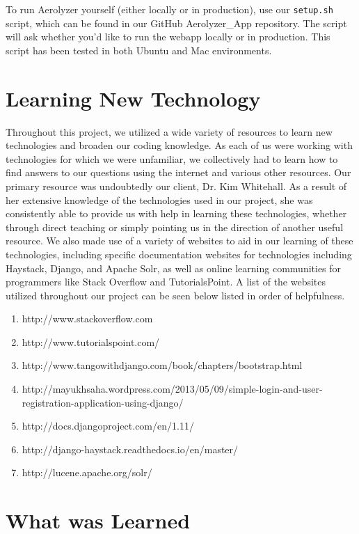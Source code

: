 \documentclass[onecolumn, draftclsnofoot,10pt, compsoc]{IEEEtran}
\begin{document}
\begin{flushleft}
To run Aerolyzer yourself (either locally or in production), use our \texttt{setup.sh} script, which can be found in our GitHub Aerolyzer\_App repository. The script will ask whether you'd like to run the webapp locally or in production. This script has been tested in both Ubuntu and Mac environments.
 
\section{Learning New Technology}
Throughout this project, we utilized a wide variety of resources to learn new technologies and broaden our coding knowledge. As each of us were working with technologies for which we were unfamiliar, we collectively had to learn how to find answers to our questions using the internet and various other resources.
\medskip
Our primary resource was undoubtedly our client, Dr. Kim Whitehall. As a result of her extensive knowledge of the technologies used in our project, she was consistently able to provide us with help in learning these technologies, whether through direct teaching or simply pointing us in the direction of another useful resource.
\medskip
We also made use of a variety of websites to aid in our learning of these technologies, including specific documentation websites for technologies including Haystack, Django, and Apache Solr, as well as online learning communities for programmers like Stack Overflow and TutorialsPoint. A list of the websites utilized throughout our project can be seen below listed in order of helpfulness.
\begin{enumerate}
    \item http://www.stackoverflow.com
    \item http://www.tutorialspoint.com/
    \item http://www.tangowithdjango.com/book/chapters/bootstrap.html
    \item http://mayukhsaha.wordpress.com/2013/05/09/simple-login-and-user-registration-application-using-django/
    \item http://docs.djangoproject.com/en/1.11/
    \item http://django-haystack.readthedocs.io/en/master/
    \item http://lucene.apache.org/solr/
\end{enumerate}
 
\section{What was Learned}

\end{flushleft}
\end{document}
